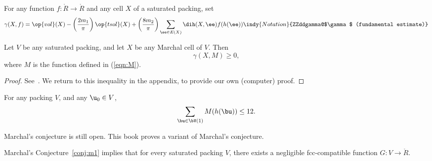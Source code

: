 \begin{definition}[$\gamma$] 
For any function $f:\ring{R}\to\ring{R}$ and any cell $X$ of a saturated packing, set
\begin{equation}\label{eqn:gamma-def} 
\gamma(X,f) =  \op{vol}(X)
-\left(\frac{2m_1}{\pi}\right) \op{tsol}(X) + \left(\frac{8m_2}{\pi}\right)
\sum_{\ee\in E(X)} \dih(X,\ee)  f(h(\ee))
\indy{Notation}{ZZddgamma@$\gamma$ (fundamental estimate)}%
\end{equation}
\end{definition}


\begin{theorem}\label{lemma:MI} 
Let $V$ be any saturated packing, and let $X$ be any Marchal cell of $V$.  Then
\begin{equation}\label{eqn:mfe} 
\gamma(X,M)\ge 0,
\end{equation}
where $M$ is the function defined in (\ref{eqn:M}).
\end{theorem}

\begin{proof}  See~\cite{marchal:2008}.  We return to this inequality in the appendix,
to provide our own (computer) proof.
\end{proof}


\begin{conjecture}[Marchal]\label{conj:m1} 
For any packing $ V$, and
any $ \u_0\in V$,
\begin{displaymath} 
\sum_{\bu\in \bV(1)} M(h(\bu)) \le 12.
\end{displaymath}
\end{conjecture}

Marchal's conjecture is still open.  This book proves a variant of
Marchal's conjecture.

\begin{theorem}\label{theorem:mk1} 
Marchal's Conjecture~\ref{conj:m1} implies
that for every saturated packing $V$, there exists a negligible fcc-compatible function
$G:V\to \ring{R}$.
\end{theorem}


